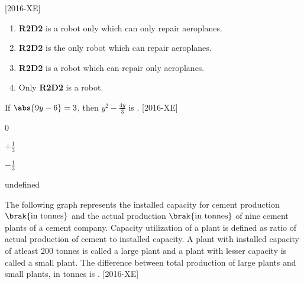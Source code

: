     \hfill{[2016-XE]}
\begin{enumerate}
    \item \textbf{R2D2} is a robot only which can only repair aeroplanes.
    \item \textbf{R2D2} is the only robot which can repair aeroplanes.
    \item \textbf{R2D2} is a robot which can  repair only aeroplanes.
    \item Only \textbf{R2D2} is a robot.
\end{enumerate}
\item If $\abs{9y-6}=3$, then $y^2-\frac{4y}{3}$ is \underline{\hspace{1cm}}. \hfill{[2016-XE]}
\begin{enumerate}
\begin{multicols}{4}
\item 0
\item $+\frac{1}{3}$
\item $-\frac{1}{3}$
\item undefined
\end{multicols}
\end{enumerate}
\item The following graph represents the installed capacity for cement production $\brak{\text{in tonnes}}$ and the actual production $\brak{\text{in tonnes}}$ of nine cement plants of a cement company. Capacity utilization of a plant is defined as ratio of actual production of cement to installed capacity. A plant with installed capacity of atleast 200 tonnes is called a large plant and a plant with lesser capacity is called a small plant. The difference between total production of large plants and small plants, in tonnes is \underline{\hspace{1cm}}. \hfill{[2016-XE]}\\
